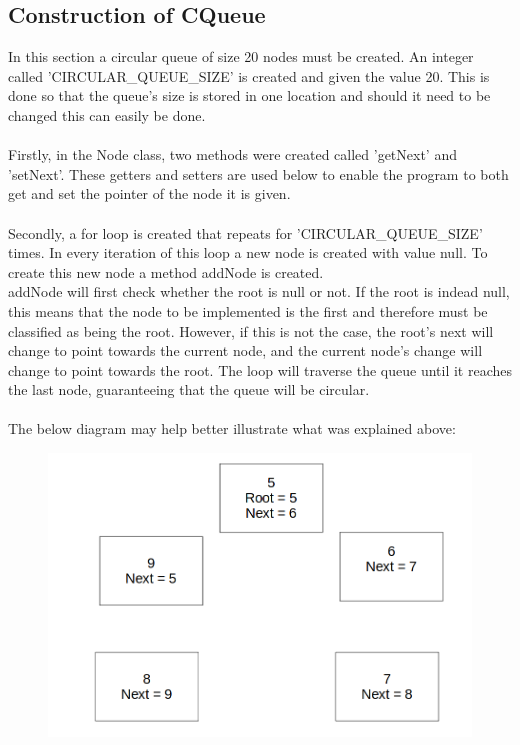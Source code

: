 \documentclass[a4paper]{article}
\begin{document}
\subsection{Construction of CQueue}
In this section a circular queue of size 20 nodes must be created. An integer called 'CIRCULAR\_QUEUE\_SIZE' is created and given the value 20. This is done so that the queue's size is stored in one location and should it need to be changed this can easily be done. \\
\\Firstly, in the Node class, two methods were created called 'getNext' and 'setNext'. These getters and setters are used below to enable the program to both get and set the pointer of the node it is given.\\
\\Secondly, a for loop is created that repeats for 'CIRCULAR\_QUEUE\_SIZE' times. In every iteration of this loop a new node is created with value null. To create this new node a method addNode is created.\\
addNode will first check whether the root is null or not. If the root is indead null, this means that the node to be implemented is the first and therefore must be classified as being the root. However, if this is not the case, the root's next will change to point towards the current node, and the current node's change will change to point towards the root. The loop will traverse the queue until it reaches the last node, guaranteeing that the queue will be circular.\\
\\The below diagram may help better illustrate what was explained above:
\bigskip

\begin{figure}[htp]
\centering
\includegraphics[scale=0.30]{Images/Insert.png}
\end{figure}
\end{document}
